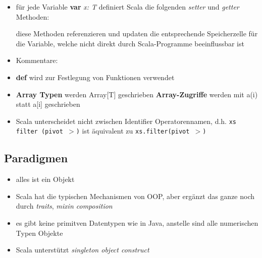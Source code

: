 \begin{itemize}
  
  \item für jede Variable \textbf{var} \textit{x: T} definiert Scala
  die folgenden \textit{setter} und \textit{getter} Methoden:
  
  
  
  diese Methoden referenzieren und updaten die entsprechende Speicherzelle für
  die Variable, welche nicht direkt durch Scala-Programme beeinflussbar ist
  \item Kommentare:

  \item \textbf{def} wird zur Festlegung von Funktionen verwendet
  \item \textbf{Array Typen} werden Array[T] geschrieben \und 
  \textbf{Array-Zugriffe} werden mit a(i) statt a[i] geschrieben
  \item Scala unterscheidet nicht zwischen Identifier \und Operatorennamen,
  d.h. \texttt{xs filter (pivot $>$)} ist äquivalent zu 
  \texttt{xs.filter(pivot $>$)}


\end{itemize}


\subsection{Paradigmen}



\begin{itemize}
  \item alles ist ein Objekt
  \item Scala hat die typischen Mechanismen von OOP, aber ergänzt das ganze
  noch durch \textit{traits}, \textit{mixin composition}
  \item es gibt keine primitven Datentypen wie in Java, anstelle sind alle 
  numerischen Typen Objekte
  \item Scala unterstützt \textit{singleton object construct}
\end{itemize}




